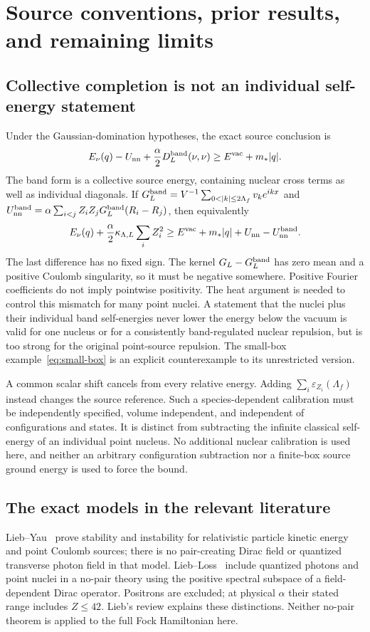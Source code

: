 \section{Source conventions, prior results, and remaining limits}
\label{b-interpretation}

\subsection{Collective completion is not an individual self-energy statement}
Under the Gaussian-domination hypotheses, the exact source conclusion is
\begin{equation}
 E_\nu(q)-U_{\rm nn}
 +\frac\alpha2D_L^{\rm band}(\nu,\nu)
 \ge E^{\mathrm{vac}}+m_*|q|.
 \label{b-collective-completion}
\end{equation}
The band form is a collective source energy, containing nuclear cross
terms as well as individual diagonals. If
$G_L^{\rm band}=V^{-1}\sum_{0<|k|\le2\Lambda_f}v_ke^{ikx}$ and
$U_{\rm nn}^{\rm band}=\alpha\sum_{i<j}Z_iZ_j
G_L^{\rm band}(R_i-R_j)$, then equivalently
\[
 E_\nu(q)+\frac\alpha2\kappa_{\Lambda,L}\sum_iZ_i^2
 \ge E^{\mathrm{vac}}+m_*|q|+U_{\rm nn}-U_{\rm nn}^{\rm band}.
\]
The last difference has no fixed sign. The kernel
$G_L-G_L^{\rm band}$ has zero mean and a positive Coulomb singularity,
so it must be negative somewhere. Positive Fourier coefficients do
not imply pointwise positivity. The heat argument is needed to control
this mismatch for many point nuclei. A statement that the nuclei plus
their individual band self-energies never lower the energy below the
vacuum is valid for one nucleus or for a consistently band-regulated
nuclear repulsion, but is too strong for the original point-source
repulsion. The small-box example~\eqref{eq:small-box} is an explicit
counterexample to its unrestricted version.

A common scalar shift cancels from every relative energy. Adding
$\sum_i\varepsilon_{Z_i}(\Lambda_f)$ instead changes the source
reference. Such a species-dependent calibration must be independently
specified, volume independent, and independent of configurations and
states. It is distinct from subtracting the infinite classical self-energy
of an individual point nucleus. No additional nuclear calibration is
used here, and neither an arbitrary configuration subtraction nor a
finite-box source ground energy is used to force the bound.

\subsection{The exact models in the relevant literature}
Lieb--Yau~\cite{LY1988} prove stability and instability for relativistic
particle kinetic energy and point Coulomb sources; there is no
pair-creating Dirac field or quantized transverse photon field in that
model. Lieb--Loss~\cite{LL2002} include quantized photons and point
nuclei in a no-pair theory using the positive spectral subspace of a
field-dependent Dirac operator. Positrons are excluded; at physical
$\alpha$ their stated range includes $Z\le42$. Lieb's review
\cite{Lieb2002} explains these distinctions. Neither no-pair theorem
is applied to the full Fock Hamiltonian here.

